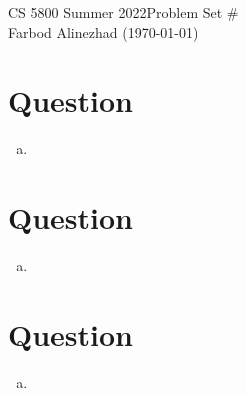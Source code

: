 

    CS 5800 Summer 2022\hfill Problem Set \#\\
    Farbod Alinezhad (\today)

    \hrulefill

    \tableofcontents
    \newpage


    \section{Question }\label{sec:question-1}
    \begin{enumerate}[(a)]
        \item
    \end{enumerate}
    \newpage


    \section{Question }\label{sec:question-2}
    \begin{enumerate}[(a)]
        \item
    \end{enumerate}

    \newpage


    \section{Question }\label{sec:question-3}
    \begin{enumerate}[(a)]
        \item
    \end{enumerate}

    \printbibliography

